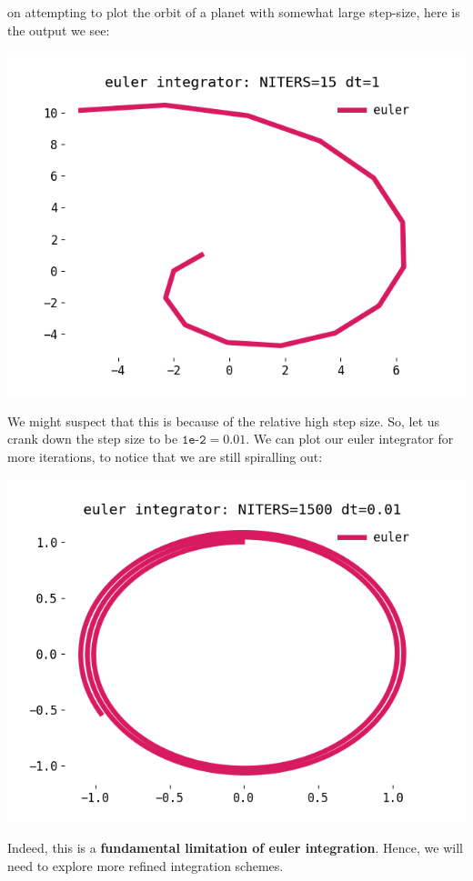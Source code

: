 \documentclass[titlepage]{article}
\begin{document}
on attempting to plot the orbit of a planet with somewhat large step-size, here is the
output we see:

\includegraphics[width=\textwidth/2]{./euler-dt-1.png}

We might suspect that this is because of the relative high step size. So,
let us crank down the step size to be $\texttt{1e-2} = 0.01$. We can
plot our euler integrator for more iterations, to notice that we are still spiralling out:

\includegraphics[width=\textwidth/2]{./euler-dt-1e-2.png}

Indeed, this is a \textbf{fundamental limitation of euler integration}.
Hence, we will need to explore more refined integration schemes.
\end{document}
